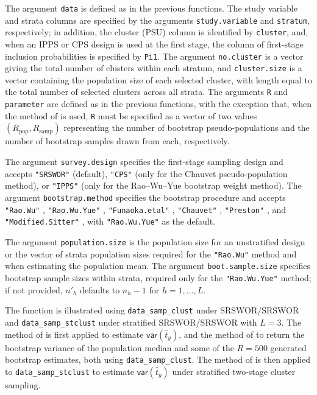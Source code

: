 The argument \texttt{data} is defined as in the previous functions. The study variable and strata columns are specified by the arguments \texttt{study.variable} and \texttt{stratum}, respectively; in addition, the cluster (PSU) column is identified by \texttt{cluster}, and, when an IPPS or CPS design is used at the first stage, the column of first-stage inclusion probabilities is specified by \texttt{Pi1}.
The argument \texttt{no.cluster} is a vector giving the total number of clusters within each stratum, and \texttt{cluster.size} is a vector containing the population size of each selected cluster, with length equal to the total number of selected clusters across all strata. The arguments \texttt{R} and \texttt{parameter} are defined as in the previous functions, with the exception that, when the method of \citet{Chauvet:2007} is used, \texttt{R} must be specified as a vector of two values \((R_\text{pop}, R_\text{samp})\) representing the number of bootstrap pseudo-populations and the number of bootstrap samples drawn from each, respectively.

The argument \texttt{survey.design} specifies the first-stage sampling design and accepts \texttt{"SRSWOR"} (default), \texttt{"CPS"} (only for the Chauvet pseudo-population method), or \texttt{"IPPS"} (only for the Rao--Wu--Yue bootstrap weight method). The argument \texttt{bootstrap.method} specifies the bootstrap procedure and accepts \texttt{"Rao.Wu"} \citep{Rao:Wu:1988}, \texttt{"Rao.Wu.Yue"} \citep{Rao:Wu:Yue:1992}, \texttt{"Funaoka.etal"} \citep{Funaoka:Saigo:Sitter:Toida:2006}, \texttt{"Chauvet"} \citep{Chauvet:2007}, \texttt{"Preston"} \citep{Preston:2009}, and \texttt{"Modified.Sitter"} \citep{Chen:Haziza:Mashreghi:2022}, with \texttt{"Rao.Wu.Yue"} as the default.

The argument \texttt{population.size} is the population size for an unstratified design or the vector of strata population sizes required for the \texttt{"Rao.Wu"} method and when estimating the population mean. The argument \texttt{boot.sample.size} specifies bootstrap sample sizes within strata, required only for the \texttt{"Rao.Wu.Yue"} method; if not provided, \(n'_h\) defaults to \(n_h - 1\) for \(h = 1, \ldots, L\).

The function is illustrated using \texttt{data\_samp\_clust} under SRSWOR/SRSWOR and \texttt{data\_samp\_stclust} under stratified SRSWOR/SRSWOR with \(L = 3\). The method of \citet{Funaoka:Saigo:Sitter:Toida:2006} is first applied to estimate \(\mathsf{var}(\hat{t}_y)\), and the method of \citet{Rao:Wu:Yue:1992} to return the bootstrap variance of the population median and some of the \(R = 500\) generated bootstrap estimates, both using \texttt{data\_samp\_clust}. The method of \citet{Preston:2009} is then applied to \texttt{data\_samp\_stclust} to estimate \(\mathsf{var}(\hat{t}_y)\) under stratified two-stage cluster sampling.

